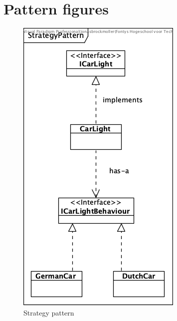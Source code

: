 \documentclass{report}
\begin{document}
    \section{Pattern figures}
    \begin{figure}[H]
        \centering
        \begin{minipage}[b]{0.4\textwidth}
            \centering
            \includegraphics{pictures/StrategyPattern.png}
            \caption{Strategy pattern}
            \label{fig:strategyPattern}
        \end{minipage}%
        \hfill
        \begin{minipage}[b]{0.4\textwidth}
            \centering

\end{minipage}
\end{figure}
\end{document}
